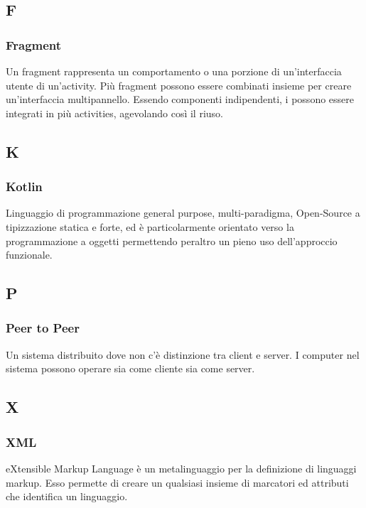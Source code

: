 \subsection*{F}
\subsubsection*{Fragment}
Un fragment rappresenta un comportamento o una porzione di un'interfaccia utente di un'activity. Più fragment possono essere combinati insieme per creare un'interfaccia multipannello. Essendo componenti indipendenti, i possono essere integrati in più activities, agevolando così il riuso.


\subsection*{K}
\subsubsection*{Kotlin}
Linguaggio di programmazione general purpose, multi-paradigma, Open-Source a tipizzazione statica e forte, ed è particolarmente orientato verso la programmazione a oggetti permettendo
peraltro un pieno uso dell'approccio funzionale.

\subsection*{P}
\subsubsection*{Peer to Peer}
Un sistema distribuito dove non c'è distinzione tra client e server. I computer nel sistema possono operare sia come cliente sia come server. 

\subsection*{X}
\subsubsection*{XML}
eXtensible Markup Language è un metalinguaggio per la definizione di linguaggi markup. Esso permette di creare un qualsiasi insieme di marcatori ed attributi che identifica un linguaggio.